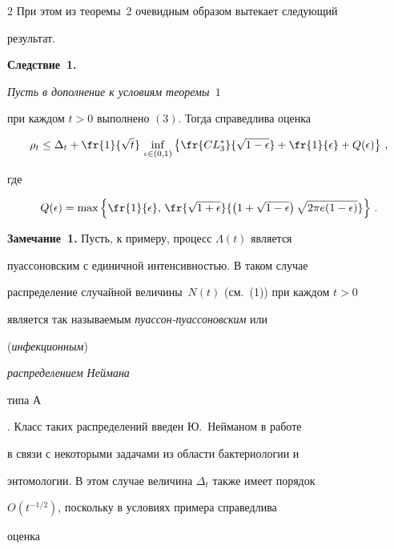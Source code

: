 \begin{multicols}{2}
При этом из теоремы~2 очевидным образом вытекает следующий


результат.





\smallskip





\noindent


\textbf{Следствие~1.} {\it Пусть в дополнение к условиям тео\-ре\-мы~$1$


при каждом $t>0$ выполнено $(3)$. Тогда справедлива оценка


$$


\rho_t \leq \Delta_t


+\fr{1}{\sqrt{t}}\,\inf_{\epsilon\in(0,1)}\left \{\fr{CL^*_3}{\sqrt{1-\epsilon}}+


\fr{1}{\epsilon}+Q(\epsilon)\right \}\,,


$$


где}


$$


Q(\epsilon)=\max\left \{\fr{1}{\epsilon},\,\fr{\sqrt{1+\epsilon}}{\left (1+\sqrt{1-\epsilon}\right )\sqrt{2\pi


e(1-\epsilon)}}\right \}\,.


$$





\medskip





\noindent


\textbf{Замечание~1.} Пусть, к примеру, процесс $\Lambda(t)$ является


пуассоновским с единичной интенсивностью. В таком случае


распределение случайной величины~$N(t)$ (см.~(1)) при каждом $t>0$


является так называемым {\it пуассон-пуассоновским} или


({\it инфекционным}) {\it распределением Неймана


типа А}. Класс таких распределений введен Ю.~Нейманом в работе~\cite{9a}


в связи с некоторыми задачами из области бактериологии и


энтомологии. В этом случае величина $\Delta_t$ также имеет порядок


$O\!\left(t^{-1/2}\right)$, поскольку в условиях примера справедлива


оценка



\end{multicols}
